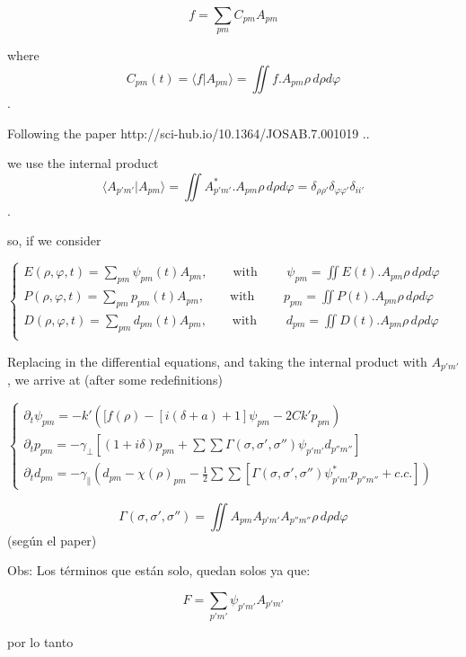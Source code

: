 		$$f=\sum_{pm}C_{pm}A_{pm}$$
		
		where $$C_{pm}(t)=\langle f | A_{pm}\rangle=\iint f.A_{pm}\rho \, d\!\rho d\!\varphi  $$.
		
		Following the paper  http://sci-hub.io/10.1364/JOSAB.7.001019 ..
		
		we use the internal product  $$\langle A_{p'm'} | A_{pm}\rangle=\iint A_{p'm'}^*.A_{pm}\rho \, d\!\rho d\!\varphi=\delta_{\rho \rho'}\delta_{\varphi \varphi'}\delta_{i i'}  $$.
		
		
		so, if we consider 
		
		$\begin{cases}
		E(\rho, \varphi, t)=\sum_{pm}\psi_{pm}(t)A_{pm}, \qquad \text{with } \qquad \psi_{pm}=\iint E(t).A_{pm}\rho \, d\!\rho d\!\varphi \\
		P(\rho, \varphi, t)=\sum_{pm}p_{pm}(t)A_{pm}, \qquad \text{with } \qquad p_{pm}=\iint P(t).A_{pm}\rho \, d\!\rho d\!\varphi \\
		D(\rho, \varphi, t)=\sum_{pm}d_{pm}(t)A_{pm}, \qquad \text{with } \qquad d_{pm}=\iint D(t).A_{pm}\rho \, d\!\rho d\!\varphi \\
		\end{cases}$
		
		Replacing in the differential equations, and taking the internal product with $A_{p'm'}$, we arrive at (after some redefinitions)
		
		$\begin{cases}
		\partial_t \psi_{pm}=-k'\left([f(\rho)-\left[i(\delta +a)+1 \right]\psi_{pm}-2Ck'p_{pm}\right)\\
		\partial_t p_{pm}=-\gamma_{\bot}[(1+i\delta)p_{pm}+\sum\sum \Gamma (\sigma, \sigma', \sigma'') \psi_{p'm'}d_{p''m''}]\\
		\partial_t d_{pm}=-\gamma_{\parallel}(d_{pm}-\chi(\rho)_{pm}-\frac{1}{2}\sum\sum [\Gamma (\sigma, \sigma', \sigma'') \psi_{p'm'}^*p_{p''m''} + c.c.])
		\end{cases}$
		
		
		$$\Gamma (\sigma, \sigma', \sigma'')=\iint A_{pm}A_{p'm'}A_{p''m''}\rho \, d\!\rho d\!\varphi  $$(según el paper)
		
	Obs:
		Los términos que están solo, quedan solos ya que:
		
		\begin{equation}
			F=\sum_{p'm'}\psi_{p'm'}A_{p'm'}%
		\end{equation}
		
		por lo tanto 
		
